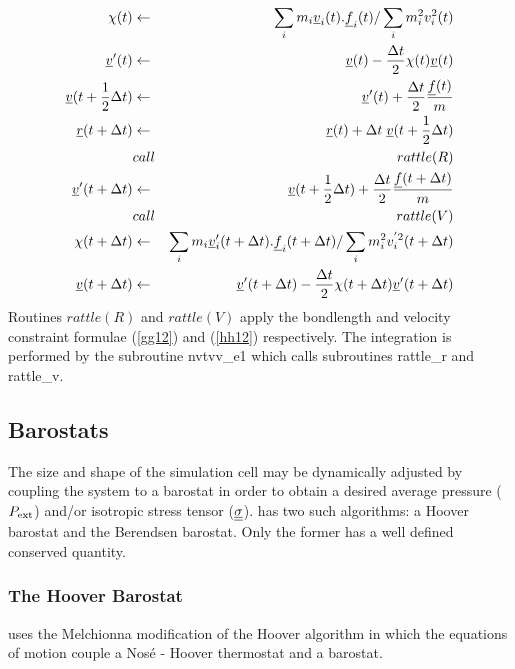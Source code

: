 \begin{eqnarray}
\chi(t) &\leftarrow& 
 \sum_i m_i \mbox{$\underline{v}$}_i(t).\mbox{$\underline{f}$}_i(t)/\sum_i m_i^2 v_i^2(t) \nonumber \\
\mbox{$\underline{v}$}'(t)&\leftarrow& \mbox{$\underline{v}$}(t) -
 {\Delta t \over 2}\chi(t)\mbox{$\underline{v}$}(t)\nonumber\\
\mbox{$\underline{v}$}(t + {1\over 2} \Delta t)&\leftarrow& \mbox{$\underline{v}$}'(t)
+ {\Delta t \over 2} {\mbox{$\underline{f}$}(t)\over m} \nonumber \\
\mbox{$\underline{r}$}(t+\Delta t) &\leftarrow& \mbox{$\underline{r}$}(t) + \Delta t \;
\mbox{$\underline{v}$}(t+{1\over 2}\Delta t)\nonumber \\
&call&rattle(R) \nonumber \\
\mbox{$\underline{v}$}'(t + \Delta t)&\leftarrow& \mbox{$\underline{v}$}(t + {1 \over 2}\Delta t) +
 {\Delta t \over 2} {\mbox{$\underline{f}$}(t + \Delta t)\over m} \nonumber \\
&call&rattle(V) \nonumber \\
\chi(t+\Delta t) &\leftarrow& 
 \sum_i m_i \mbox{$\underline{v}$}'_i(t+\Delta t).\mbox{$\underline{f}$}_i(t+\Delta t)/\sum_i m_i^2
 v_i^{'2}(t+\Delta t) \nonumber \\
\mbox{$\underline{v}$}(t + \Delta t)&\leftarrow& \mbox{$\underline{v}$}'(t + \Delta t) -
 {\Delta t \over 2}\chi(t+\Delta t)\mbox{$\underline{v}$}'(t+\Delta t)
\end{eqnarray}
Routines $rattle(R)$ and $rattle(V)$ apply the bondlength and velocity
constraint formulae (\ref{gg12}) and (\ref{hh12}) respectively.  The
integration is performed by the subroutine {\sc nvtvv\_e1} which calls
subroutines {\sc rattle\_r} and {\sc rattle\_v}.

\subsection{Barostats}

The size and shape of the simulation cell may be dynamically adjusted
by coupling the system to a barostat in order to obtain a desired
average pressure ($P_{\rm ext}$) and/or isotropic stress
tensor ($\mbox{$\underline{\underline{\bf \sigma}}$}$).
\D{} has two such algorithms: a Hoover barostat and the Berendsen 
barostat. Only the former has a well defined conserved quantity.

\subsubsection{The Hoover Barostat}

\D{} uses the Melchionna modification of the Hoover algorithm 
\cite{melchionna-93a} in which the equations of motion couple
a Nos\'e - Hoover thermostat and a barostat.

